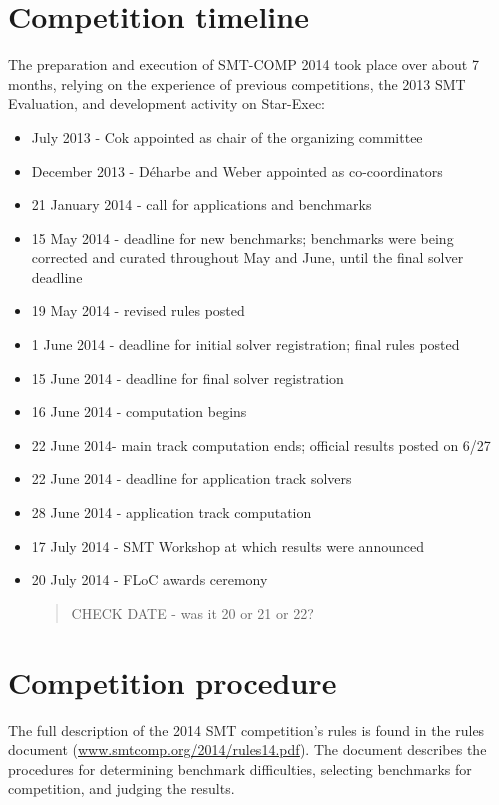 \documentclass[twosize,11pt]{article}
\newcommand{\comment}[2]{\begin{quote}\sc #1\marginpar{\textcolor{red}{$\ast^{\mbox{#2}}$}}\end{quote}}
\newcommand{\davidc}[1]{\comment{#1}{DC}}
\begin{document}
\section{Competition timeline}
\label{sec:timeline}

The preparation and execution of SMT-COMP 2014 took place over about 7 months, relying on the experience of previous competitions, the 2013 SMT Evaluation, and development activity on Star-Exec:
\begin{itemize}
\item July 2013 - Cok appointed as chair of the organizing committee
\item December 2013 - D\'{e}harbe and Weber appointed as co-coordinators
\item 21 January 2014 - call for applications and benchmarks
\item 15 May 2014 - deadline for new benchmarks; benchmarks were being corrected and curated throughout May and June, until the final solver deadline
\item 19 May 2014 - revised rules posted
\item 1 June 2014 - deadline for initial solver registration; final rules posted
\item 15 June 2014 - deadline for final solver registration
\item 16 June 2014 - computation begins
\item 22 June 2014- main track computation ends; official results posted on 6/27 
\item 22 June 2014 - deadline for application track solvers
\item 28 June 2014 - application track computation
\item 17 July 2014 - SMT Workshop at which results were announced
\item 20 July 2014 - FLoC awards ceremony \davidc{CHECK DATE - was it 20 or 21 or 22?}
\end{itemize}

\section{Competition procedure} 
\label{sec:procedure}


The full description of the 2014 SMT competition's rules is found in the rules document (\url{www.smtcomp.org/2014/rules14.pdf}). The document describes the procedures for determining benchmark difficulties, selecting benchmarks for competition, and judging the results.
\end{document}
